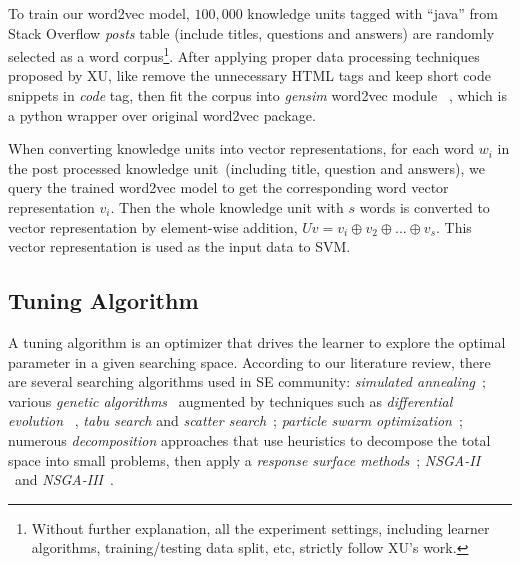 \documentclass[sigconf]{acmart}
\theoremstyle{break}
\begin{document}
 

To train our word2vec model, $100,000$ knowledge units tagged with ``java'' from
Stack Overflow {\it posts} table  (include titles, questions and answers)
are randomly selected as a word corpus\footnote{Without further explanation, 
all the experiment settings, including learner algorithms,
training/testing data split, etc, strictly follow XU's work. }. 
After applying proper data processing techniques proposed by XU, like
 remove the unnecessary HTML tags and keep short code snippets in
{\it code} tag, then fit the corpus into {\it gensim} word2vec module ~\cite{rehurek2010software},
which is a python wrapper over original word2vec package.

When converting knowledge units into vector representations, 
for each word $w_i$ in the post processed knowledge unit~(including title, question and answers),
we query the trained word2vec model to get the corresponding word vector representation $v_i$.
Then the whole knowledge unit with $s$ words
is converted to vector representation by element-wise addition, $Uv = v_i \oplus v_2 \oplus...\oplus v_s $. 
This vector representation is used
as the input data to SVM.



\subsection{Tuning Algorithm}

A tuning algorithm is an optimizer that  drives the learner to explore
the optimal parameter in a given searching space. According to our
literature review, there are several searching algorithms used in 
SE community:{\em 
simulated annealing}~\cite{feather2002converging,menzies2007data};
 various {\em genetic algorithms}~\cite{jones1996automatic,harman2007current, arcuri2011parameter} augmented by
techniques such as {\em differential evolution}
~\cite{storn1997differential, fu2016tuning, fu2016differential,chaves2015differential,agrawal2016wrong}, 
{\em tabu search} and {\em scatter search}~\cite{beausoleil2006moss,molina2007sspmo,corazza2013using};
{\em particle swarm optimization}~\cite{windisch2007applying}; 
numerous {\em decomposition} approaches that use
    heuristics to decompose the total space into   small problems,   then apply a
    {\em response surface methods}~\cite{krall2015gale};
     {\em NSGA-II} ~\cite{zhang2007multi}and {\em NSGA-III}~\cite{mkaouer2014high}.
\end{document}
